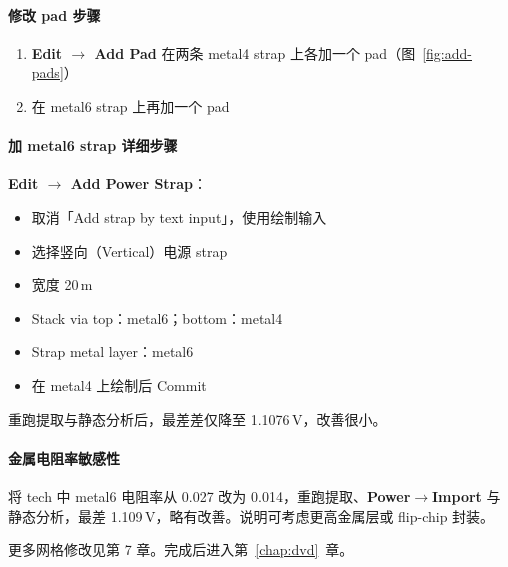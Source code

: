 \paragraph{修改 pad 步骤}
\begin{enumerate}
  \item \textbf{Edit $\rightarrow$ Add Pad} 在两条 metal4 strap 上各加一个 pad（图~\ref{fig:add-pads}）
  \item 在 metal6 strap 上再加一个 pad
\end{enumerate}

\paragraph{加 metal6 strap 详细步骤}
\textbf{Edit $\rightarrow$ Add Power Strap}：
\begin{itemize}
  \item 取消「Add strap by text input」，使用绘制输入
  \item 选择竖向（Vertical）电源 strap
  \item 宽度 20\,\textmu m
  \item Stack via top：metal6；bottom：metal4
  \item Strap metal layer：metal6
  \item 在 metal4 上绘制后 Commit
\end{itemize}
重跑提取与静态分析后，最差差仅降至 1.1076\,V，改善很小。

\paragraph{金属电阻率敏感性}
将 tech 中 metal6 电阻率从 0.027 改为 0.014，重跑提取、\textbf{Power$\rightarrow$Import} 与静态分析，最差 1.109\,V，略有改善。说明可考虑更高金属层或 flip-chip 封装。


更多网格修改见第 7 章。完成后进入第~\ref{chap:dvd}~章。
